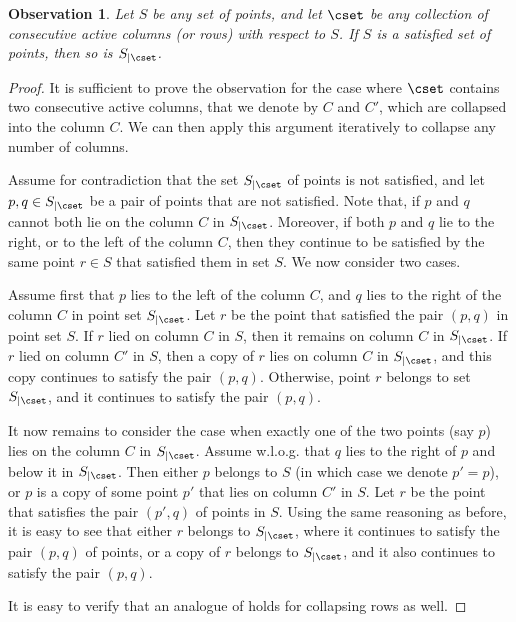 \documentclass{toc}
\newtheorem{myobs}[theorem]{Observation}
\begin{document}
\begin{myobs}\label{obs: collapsing columns}
Let $S$ be any set of points, and let $\cset$ be any collection of consecutive active columns (or rows) with respect to $S$. If $S$ is a satisfied set of points, then so is $S_{|\cset}$.
\end{myobs}
\begin{proof}
It is sufficient to prove the observation for the case where $\cset$ contains two consecutive active columns, that we denote by $C$ and $C'$, which are collapsed into the column $C$. We can then apply this argument iteratively to collapse any number of columns.

Assume for contradiction that the set $S_{|\cset}$ of points is not satisfied, and let $p,q\in S_{|\cset}$ be a pair of points that are not satisfied. Note that, if $p$ and $q$ cannot both lie on the column $C$ in $S_{|\cset}$. Moreover, if both $p$ and $q$ lie to the right, or to the left of the column $C$, then they continue to be satisfied by the same point $r\in S$ that satisfied them in set $S$. We now consider two cases.

Assume first that $p$ lies to the left of the column $C$, and $q$ lies to the right of the column $C$ in point set $S_{|\cset}$. Let $r$ be the point that satisfied the pair $(p,q)$ in point set $S$. If $r$ lied on column $C$ in $S$, then it remains on column $C$ in $S_{|\cset}$. If $r$ lied on column $C'$ in $S$, then a copy of $r$ lies on column $C$ in $S_{|\cset}$, and this copy continues to satisfy the pair $(p,q)$. Otherwise, point $r$ belongs to set $S_{|\cset}$, and it continues to satisfy the pair $(p,q)$.

It now remains to consider the case when exactly one of the two points (say $p$) lies on the column $C$ in $S_{|\cset}$. Assume w.l.o.g. that $q$ lies to the right of $p$ and below it in $S_{|\cset}$. Then either $p$ belongs to $S$ (in which case we denote $p'=p$), or $p$ is a copy of some point $p'$ that lies on column $C'$ in $S$. Let $r$ be the point that satisfies the pair $(p',q)$ of points in $S$. Using the same reasoning as before, it is easy to see that either $r$ belongs to $S_{|\cset}$, where it continues to satisfy the pair $(p,q)$ of points, or  a copy of $r$ belongs to $S_{|\cset}$, and it also continues to satisfy the pair $(p,q)$.

It is easy to verify that an analogue of  holds for collapsing rows as well.
\end{proof}
\end{document}
